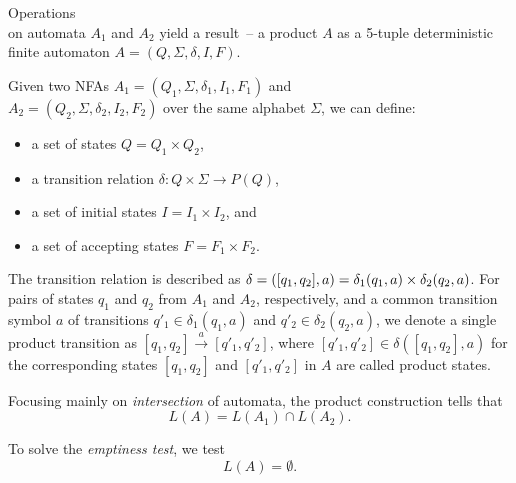 \begin{definition}
Operations \\ on automata $A_1$ and $A_2$ yield a result~-- a product $A$ as a 5-tuple deterministic finite automaton $A = (Q, \Sigma, \delta, I, F)$.

Given two NFAs $A_1 = (Q_1, \Sigma, \delta_1, I_1, F_1)$ and \\ $A_2 = (Q_2, \Sigma, \delta_2, I_2, F_2)$ over the same alphabet $\Sigma$, we can define:
\begin{itemize}
    \item a set of states $Q = Q_1 \times Q_2$,
    \item a transition relation $\delta: Q \times \Sigma \rightarrow{} P(Q)$,
    \item a set of initial states $I = I_1 \times I_2$, and
    \item a set of accepting states $F = F_1 \times F_2$.
\end{itemize}
\end{definition}

The transition relation is described as $\delta = \\ ([q_1, q_2], a) = \delta_1(q_1, a) \times \delta_2(q_2, a)$. For pairs of states $q_1$ and $q_2$ from $A_1$ and $A_2$, respectively, and a common transition symbol $a$ of transitions $q'_1 \in \delta_1(q_1, a)$ and $q'_2 \in \delta_2(q_2,a)$, we denote a single product transition as $[q_1, q_2] \xrightarrow{a} [q'_1, q'_2]$, where $[q'_1, q'_2] \in \delta([q_1, q_2], a)$ for the corresponding states $[q_1, q_2]$ and $[q'_1, q'_2]$ in $A$ are called product states.

Focusing mainly on \emph{intersection} of automata, the product construction tells that
$$ L(A) = L(A_1) \cap L(A_2) \text{.} $$

To solve the \emph{emptiness test}, we test
$$ L(A) = \emptyset \text{.}$$

